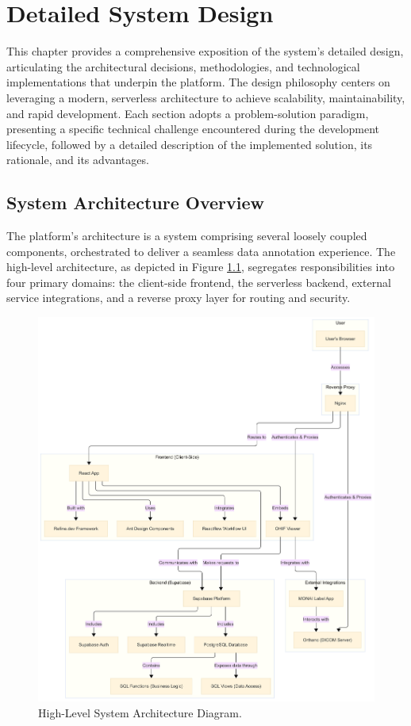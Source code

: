 \chapter{Detailed System Design}
\label{chap:system_design}

This chapter provides a comprehensive exposition of the system's detailed design, articulating the architectural decisions, methodologies, and technological implementations that underpin the platform. The design philosophy centers on leveraging a modern, serverless architecture to achieve scalability, maintainability, and rapid development. Each section adopts a problem-solution paradigm, presenting a specific technical challenge encountered during the development lifecycle, followed by a detailed description of the implemented solution, its rationale, and its advantages.

\section{System Architecture Overview}
\label{sec:system_architecture_overview}

The platform's architecture is a system comprising several loosely coupled components, orchestrated to deliver a seamless data annotation experience. The high-level architecture, as depicted in Figure \ref{fig:system_architecture}, segregates responsibilities into four primary domains: the client-side frontend, the serverless backend, external service integrations, and a reverse proxy layer for routing and security.

\begin{figure}[H]
    \centering
    \includegraphics[width=1\linewidth]{content//resources//images//chap4-system-design/architecture.png}
    \caption{High-Level System Architecture Diagram.}
    \label{fig:system_architecture}
\end{figure}

